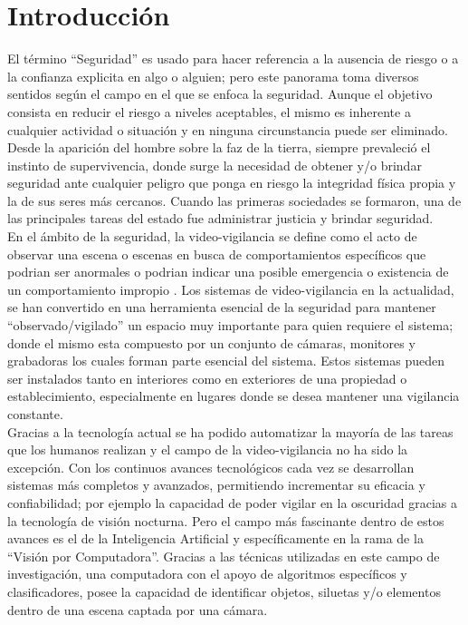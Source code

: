 \chapter{Introducción}

El término ``Seguridad'' es usado para hacer referencia a la ausencia de riesgo o a la confianza explicita en algo o alguien; pero este panorama toma diversos sentidos según el campo en el que se enfoca la seguridad. Aunque el objetivo consista en reducir el riesgo a niveles aceptables, el mismo es inherente a cualquier actividad o situación y en ninguna circunstancia puede ser eliminado.\\

Desde la aparición del hombre sobre la faz de la tierra, siempre prevaleció el instinto de supervivencia, donde surge la necesidad de obtener y/o brindar seguridad ante cualquier peligro que ponga en riesgo la integridad física propia y la de sus seres más cercanos. Cuando las primeras sociedades se formaron, una de las principales tareas del estado fue administrar justicia y brindar seguridad.\\

En el ámbito de la seguridad, la video-vigilancia se define como el acto de observar una escena o escenas en busca de comportamientos específicos que podrian ser anormales o podrian indicar una posible emergencia o existencia de un comportamiento impropio \cite{NORMAN:201795}. Los sistemas de video-vigilancia en la actualidad, se han convertido en una herramienta esencial de la seguridad para mantener ``observado/vigilado'' un espacio muy importante para quien requiere el sistema; donde el mismo esta compuesto por un conjunto de cámaras, monitores y grabadoras los cuales forman parte esencial del sistema. Estos sistemas pueden ser instalados tanto en interiores como en exteriores de una propiedad o establecimiento, especialmente en lugares donde se desea mantener una vigilancia constante.\\

Gracias a la tecnología actual se ha podido automatizar la mayoría de las tareas que los humanos realizan y el campo de la video-vigilancia no ha sido la excepción. Con los continuos avances tecnológicos cada vez se desarrollan sistemas más completos y avanzados, permitiendo incrementar su eficacia y confiabilidad; por ejemplo la capacidad de poder vigilar en la oscuridad gracias a la tecnología de visión nocturna. Pero el campo más fascinante dentro de estos avances es el de la Inteligencia Artificial y específicamente en la rama de la ``Visión por Computadora''. Gracias a las técnicas utilizadas en este campo de investigación, una computadora con el apoyo de algoritmos específicos y clasificadores, posee la capacidad de identificar objetos, siluetas y/o elementos dentro de una escena captada por una cámara.\\

